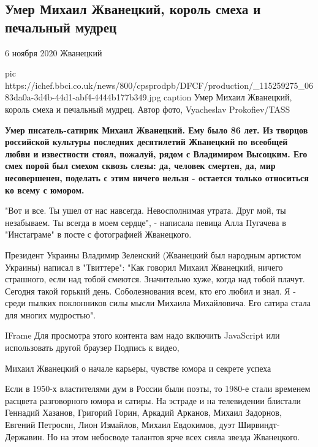  
 
 

\subsection{Умер Михаил Жванецкий, король смеха и печальный мудрец}

6 ноября 2020
Жванецкий

\ifcmt
pic https://ichef.bbci.co.uk/news/800/cpsprodpb/DFCF/production/_115259275_0683da0a-3d4b-44d1-abf4-4444b177b349.jpg
caption Умер Михаил Жванецкий, король смеха и печальный мудрец. Автор фото, Vyacheslav Prokofiev/TASS
\fi


{\bfseries
Умер писатель-сатирик Михаил Жванецкий. Ему было 86 лет. Из творцов российской
культуры последних десятилетий Жванецкий по всеобщей любви и известности стоял,
пожалуй, рядом с Владимиром Высоцким. Его смех порой был смехом сквозь слезы:
да, человек смертен, да, мир несовершенен, поделать с этим ничего нельзя -
остается только относиться ко всему с юмором.
}

"Вот и все. Ты ушел от нас навсегда. Невосполнимая утрата. Друг мой, ты
незабываем. Ты всегда в моем сердце", - написала певица Алла Пугачева в
"Инстаграме" в посте с фотографией Жванецкого.

Президент Украины Владимир Зеленский (Жванецкий был народным артистом
Украины) написал в "Твиттере": "Как говорил Михаил Жванецкий, ничего
страшного, если над тобой смеются. Значительно хуже, когда над тобой
плачут. Сегодня такой горький день. Соболезнования всем, кто его любил и
знал. Я - среди пылких поклонников силы мысли Михаила Михайловича. Его
сатира стала для многих мудростью".

IFrame
Для просмотра этого контента вам надо включить JavaScript или использовать
другой браузер
Подпись к видео,

Михаил Жванецкий о начале карьеры, чувстве юмора и секрете успеха

Если в 1950-х властителями дум в России были поэты, то 1980-е стали
временем расцвета разговорного юмора и сатиры. На эстраде и на телевидении
блистали Геннадий Хазанов, Григорий Горин, Аркадий Арканов, Михаил
Задорнов, Евгений Петросян, Лион Измайлов, Михаил Евдокимов, дуэт
Ширвиндт-Державин. Но на этом небосводе талантов ярче всех сияла звезда
Жванецкого.

